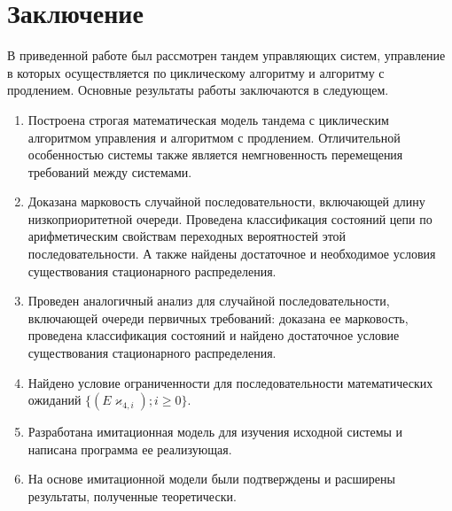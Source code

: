 \chapter*{Заключение}						%


В приведенной работе был рассмотрен тандем управляющих систем, управление в которых осуществляется по циклическому алгоритму и алгоритму с продлением. Основные результаты работы заключаются в следующем.

    \begin{enumerate}
        \item Построена строгая математическая модель тандема с циклическим алгоритмом управления и алгоритмом с продлением. Отличительной особенностью системы также является немгновенность перемещения требований между системами. 
        \item Доказана марковость случайной последовательности, включающей длину низкоприоритетной очереди. Проведена классификация состояний цепи по арифметическим свойствам переходных вероятностей этой последовательности. А также найдены достаточное и необходимое условия существования стационарного распределения.
        \item Проведен аналогичный анализ для случайной последовательности, включающей очереди первичных требований: доказана ее марковость, проведена классификация состояний и найдено достаточное условие существования стационарного распределения.
        \item Найдено условие ограниченности для последовательности математических ожиданий $    \{( E\varkappa_{4,i}); i \geqslant 0\}$.
        \item Разработана имитационная модель для изучения исходной системы и написана программа ее реализующая.
        \item На основе имитационной модели были подтверждены и расширены результаты, полученные теоретически.
    \end{enumerate}


